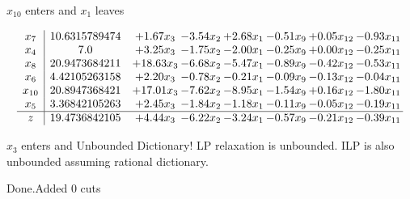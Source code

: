 \documentclass[8pt]{article}
\begin{document}
 $ x_{10} $ enters and $ x_{1} $ leaves 

 \[\begin{array}{c| c c@{\hskip 2pt} c@{\hskip 2pt} c@{\hskip 2pt} c@{\hskip 2pt} c@{\hskip 2pt} c@{\hskip 2pt} }
 x_{7}   &  10.6315789474 & +  1.67 x_{3} & -3.54 x_{2} & +  2.68 x_{1} & -0.51 x_{9} & +  0.05 x_{12} & -0.93 x_{11}\\
 x_{4}   &  7.0 & +  3.25 x_{3} & -1.75 x_{2} & -2.00 x_{1} & -0.25 x_{9} & +  0.00 x_{12} & -0.25 x_{11}\\
 x_{8}   &  20.9473684211 & + 18.63 x_{3} & -6.68 x_{2} & -5.47 x_{1} & -0.89 x_{9} & -0.42 x_{12} & -0.53 x_{11}\\
 x_{6}   &  4.42105263158 & +  2.20 x_{3} & -0.78 x_{2} & -0.21 x_{1} & -0.09 x_{9} & -0.13 x_{12} & -0.04 x_{11}\\
 x_{10}   &  20.8947368421 & + 17.01 x_{3} & -7.62 x_{2} & -8.95 x_{1} & -1.54 x_{9} & +  0.16 x_{12} & -1.80 x_{11}\\
 x_{5}   &  3.36842105263 & +  2.45 x_{3} & -1.84 x_{2} & -1.18 x_{1} & -0.11 x_{9} & -0.05 x_{12} & -0.19 x_{11}\\
\hline
z    &  19.4736842105 & +  4.44 x_{3} & -6.22 x_{2} & -3.24 x_{1} & -0.57 x_{9} & -0.21 x_{12} & -0.39 x_{11}\\
\end{array}\]


 $ x_{3} $ enters and Unbounded Dictionary!
 LP relaxation is unbounded. ILP is also unbounded assuming rational dictionary. 

Done.Added 0 cuts 
\end{document}
